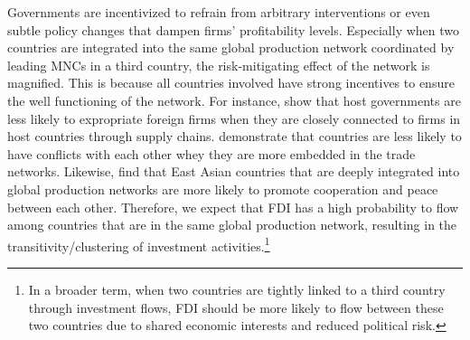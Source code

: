 \documentclass[reqno,onecolumn,letterpaper,12pt]{article}
\begin{document}
Governments are incentivized to refrain from arbitrary interventions or even subtle policy changes that dampen firms' profitability levels. Especially when two countries are integrated into the same global production network coordinated by leading MNCs in a third country, the risk-mitigating effect of the network is magnified. This is because all countries involved have strong incentives to ensure the well functioning of the network. For instance, \citet{johns2016under} show that host governments are less likely to expropriate foreign firms when they are closely connected to firms in host countries through supply chains. \citet{Dorussen_Ward:2010} demonstrate that countries are less likely to have conflicts with each other whey they are more embedded in the trade networks. Likewise, \citet{Kim_Solingen:2017} find that East Asian countries that are deeply integrated into global production networks are more likely to promote cooperation and peace between each other. Therefore, we expect that FDI has a high probability to flow among countries that are in the same global production network, resulting in the transitivity/clustering of investment activities.\footnote{In a broader term, when two countries are tightly linked to a third country through investment flows, FDI should be more likely to flow between these two countries due to shared economic interests and reduced political risk. }

\end{document}
